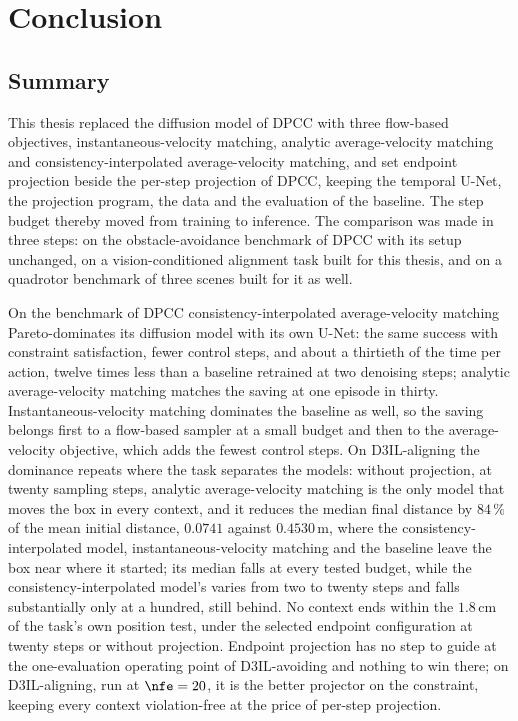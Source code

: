 \chapter{Conclusion}\label{ch:conclusion}

\section{Summary}\label{sec:conc:summary}

This thesis replaced the diffusion model of \ac{DPCC} with three flow-based objectives,
instantaneous-velocity matching, analytic average-velocity matching and consistency-interpolated
average-velocity matching, and set endpoint projection beside the per-step projection of \ac{DPCC},
keeping the temporal U-Net, the projection program, the data and the evaluation of the baseline. The
step budget thereby moved from training to inference. The comparison was made in three steps: on the
obstacle-avoidance benchmark of \ac{DPCC} with its setup unchanged, on a vision-conditioned alignment
task built for this thesis, and on a quadrotor benchmark of three scenes built for it as well.

On the benchmark of \ac{DPCC} consistency-interpolated average-velocity matching Pareto-dominates its
diffusion model with its own U-Net: the same success with constraint satisfaction, fewer control
steps, and about a thirtieth of the time per action, twelve times less than a baseline retrained at
two denoising steps; analytic average-velocity matching matches the saving at one episode in thirty.
Instantaneous-velocity matching dominates the baseline as well, so the saving belongs first to a
flow-based sampler at a small budget and then to the average-velocity objective, which adds the fewest
control steps. On D3IL-aligning the dominance repeats where the task separates the models: without projection, at
twenty sampling steps, analytic average-velocity matching is the only model that moves the box in
every context, and it reduces the median final distance by $84\,\%$ of the mean initial distance,
$0.0741$ against $0.4530$\,m, where the consistency-interpolated model, instantaneous-velocity
matching and the baseline leave the box near where it started; its median falls at every tested
budget, while the consistency-interpolated model's varies from two to twenty steps and falls
substantially only at a hundred, still behind. No context ends within the $1.8$\,cm of the task's own
position test, under the selected endpoint configuration at twenty steps or without projection.
Endpoint projection has no step to guide at the one-evaluation operating point of D3IL-avoiding and
nothing to win there; on D3IL-aligning, run at $\nfe = 20$, it is the better projector on the
constraint, keeping every context violation-free at the price of per-step projection.

